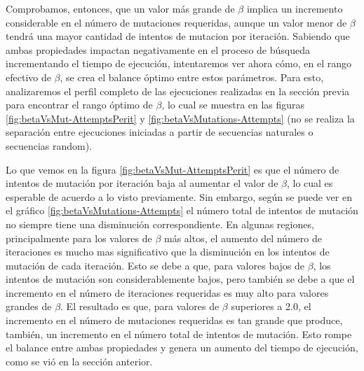 
Comprobamos, entonces, que un valor más grande de $\beta$ implica un incremento considerable en el número de mutaciones requeridas, aunque un valor menor de $\beta$ tendrá una mayor cantidad de intentos de mutacion por iteración.
Sabiendo que ambas propiedades impactan negativamente en el proceso de búsqueda incrementando el tiempo de ejecución, 
intentaremos ver ahora cómo, en el rango efectivo de $\beta$, se crea el balance óptimo entre estos parámetros.
Para esto, analizaremos el perfil completo de las ejecuciones realizadas en la sección previa para encontrar el rango óptimo de $\beta$, 
lo cual se muestra en las figuras \ref{fig:betaVsMut-AttemptsPerit} y \ref{fig:betaVsMutations-Attempts} (no se realiza la separación entre ejecuciones iniciadas a partir de secuencias naturales o secuencias random).

Lo que vemos en la figura \ref{fig:betaVsMut-AttemptsPerit} es que el número de intentos de mutación por iteración baja al aumentar el valor de $\beta$, lo cual es esperable de acuerdo a lo visto previamente.
Sin embargo, según se puede ver en el gráfico \ref{fig:betaVsMutations-Attempts} el número total de intentos de mutación no siempre tiene una disminución correspondiente.
En algunas regiones, principalmente para los valores de $\beta$ más altos, el aumento del número de iteraciones es mucho mas significativo que la disminución en los intentos de mutación de cada iteración.
Esto se debe a que, para valores bajos de $\beta$, los intentos de mutación son considerablemente bajos, pero también se debe a que el incremento en el número de iteraciones requeridas es muy alto para valores grandes de $\beta$.
El resultado es que, para valores de $\beta$ superiores a 2.0, el incremento en el número de mutaciones requeridas es tan grande que produce, también, un incremento en el número total de intentos de mutación.
Esto rompe el balance entre ambas propiedades y genera un aumento del tiempo de ejecución, como se vió en la sección anterior.

